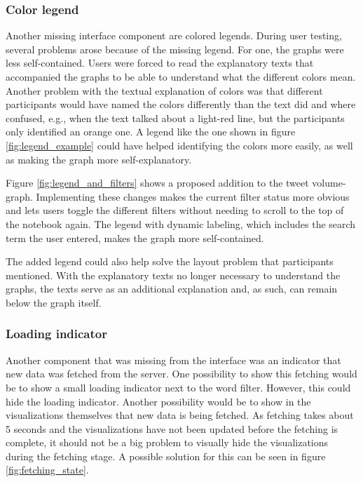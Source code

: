 \subsubsection*{Color legend}
Another missing interface component are colored legends. During user testing, several problems arose because of the missing legend. For one, the graphs were less self-contained. Users were forced to read the explanatory texts that accompanied the graphs to be able to understand what the different colors mean. Another problem with the textual explanation of colors was that different participants would have named the colors differently than the text did and where confused, e.g., when the text talked about a light-red line, but the participants only identified an orange one. A legend like the one shown in figure \ref{fig:legend_example} could have helped identifying the colors more easily, as well as making the graph more self-explanatory.

Figure \ref{fig:legend_and_filters} shows a proposed addition to the tweet volume-graph. Implementing these changes makes the current filter status more obvious and lets users toggle the different filters without needing to scroll to the top of the notebook again. The legend with dynamic labeling, which includes the search term the user entered, makes the graph more self-contained.

The added legend could also help solve the layout problem that participants mentioned. With the explanatory texts no longer necessary to understand the graphs, the texts serve as an additional explanation and, as such, can remain below the graph itself.

\subsubsection*{Loading indicator}
Another component that was missing from the interface was an indicator that new data was fetched from the server. One possibility to show this fetching would be to show a small loading indicator next to the word filter. However, this could hide the loading indicator. Another possibility would be to show in the visualizations themselves that new data is being fetched. As fetching takes about 5 seconds and the visualizations have not been updated before the fetching is complete, it should not be a big problem to visually hide the visualizations during the fetching stage. A possible solution for this can be seen in figure \ref{fig:fetching_state}.

